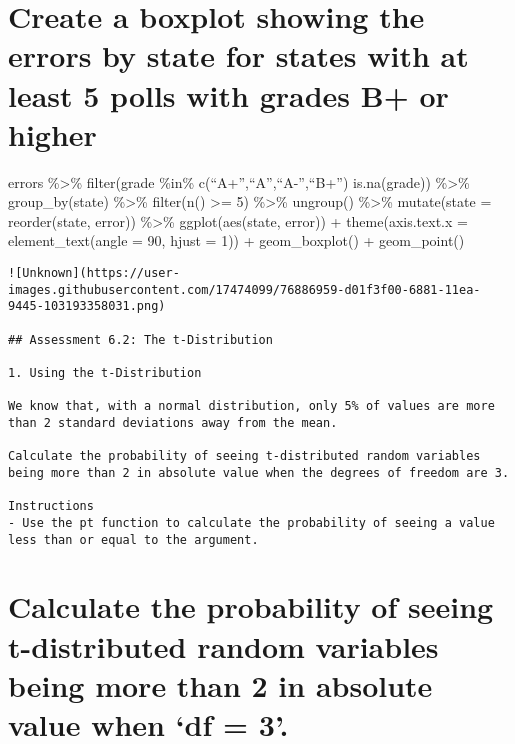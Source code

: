 \documentclass[
]{article}
\begin{document}
\begin{verbatim}
\end{verbatim}

\hypertarget{create-a-boxplot-showing-the-errors-by-state-for-states-with-at-least-5-polls-with-grades-b-or-higher}{%
\section{Create a boxplot showing the errors by state for states with at
least 5 polls with grades B+ or
higher}\label{create-a-boxplot-showing-the-errors-by-state-for-states-with-at-least-5-polls-with-grades-b-or-higher}}

errors \%\textgreater\% filter(grade \%in\%
c(``A+'',``A'',``A-'',``B+'') \textbar{} is.na(grade)) \%\textgreater\%
group\_by(state) \%\textgreater\% filter(n() \textgreater= 5)
\%\textgreater\% ungroup() \%\textgreater\% mutate(state =
reorder(state, error)) \%\textgreater\% ggplot(aes(state, error)) +
theme(axis.text.x = element\_text(angle = 90, hjust = 1)) +
geom\_boxplot() + geom\_point()

\begin{verbatim}
![Unknown](https://user-images.githubusercontent.com/17474099/76886959-d01f3f00-6881-11ea-9445-103193358031.png)

## Assessment 6.2: The t-Distribution

1. Using the t-Distribution

We know that, with a normal distribution, only 5% of values are more than 2 standard deviations away from the mean.

Calculate the probability of seeing t-distributed random variables being more than 2 in absolute value when the degrees of freedom are 3.

Instructions
- Use the pt function to calculate the probability of seeing a value less than or equal to the argument.
\end{verbatim}

\hypertarget{calculate-the-probability-of-seeing-t-distributed-random-variables-being-more-than-2-in-absolute-value-when-df-3.}{%
\section{Calculate the probability of seeing t-distributed random
variables being more than 2 in absolute value when `df =
3'.}\label{calculate-the-probability-of-seeing-t-distributed-random-variables-being-more-than-2-in-absolute-value-when-df-3.}}
\end{document}
